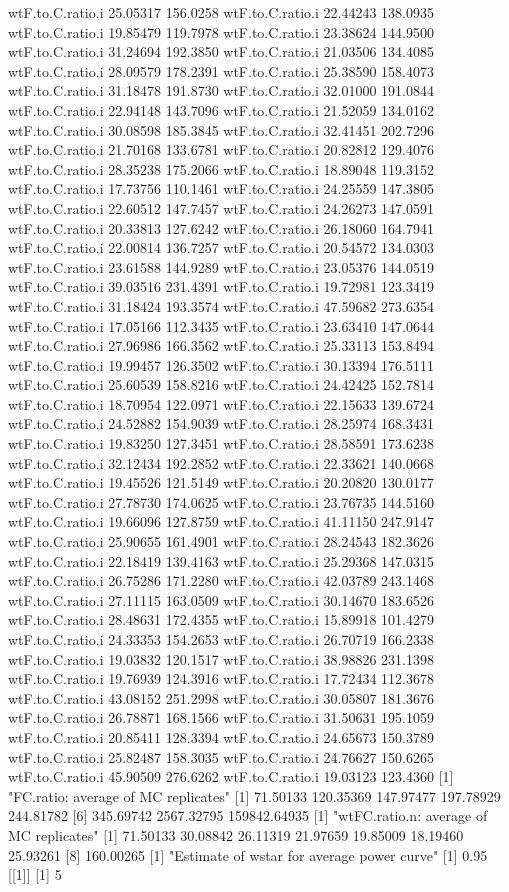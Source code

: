 \documentclass[11pt]{article} %
\begin{document}
\begin{Schunk}
\begin{Soutput}
wtF.to.C.ratio.i 25.05317 156.0258
wtF.to.C.ratio.i 22.44243 138.0935
wtF.to.C.ratio.i 19.85479 119.7978
wtF.to.C.ratio.i 23.38624 144.9500
wtF.to.C.ratio.i 31.24694 192.3850
wtF.to.C.ratio.i 21.03506 134.4085
wtF.to.C.ratio.i 28.09579 178.2391
wtF.to.C.ratio.i 25.38590 158.4073
wtF.to.C.ratio.i 31.18478 191.8730
wtF.to.C.ratio.i 32.01000 191.0844
wtF.to.C.ratio.i 22.94148 143.7096
wtF.to.C.ratio.i 21.52059 134.0162
wtF.to.C.ratio.i 30.08598 185.3845
wtF.to.C.ratio.i 32.41451 202.7296
wtF.to.C.ratio.i 21.70168 133.6781
wtF.to.C.ratio.i 20.82812 129.4076
wtF.to.C.ratio.i 28.35238 175.2066
wtF.to.C.ratio.i 18.89048 119.3152
wtF.to.C.ratio.i 17.73756 110.1461
wtF.to.C.ratio.i 24.25559 147.3805
wtF.to.C.ratio.i 22.60512 147.7457
wtF.to.C.ratio.i 24.26273 147.0591
wtF.to.C.ratio.i 20.33813 127.6242
wtF.to.C.ratio.i 26.18060 164.7941
wtF.to.C.ratio.i 22.00814 136.7257
wtF.to.C.ratio.i 20.54572 134.0303
wtF.to.C.ratio.i 23.61588 144.9289
wtF.to.C.ratio.i 23.05376 144.0519
wtF.to.C.ratio.i 39.03516 231.4391
wtF.to.C.ratio.i 19.72981 123.3419
wtF.to.C.ratio.i 31.18424 193.3574
wtF.to.C.ratio.i 47.59682 273.6354
wtF.to.C.ratio.i 17.05166 112.3435
wtF.to.C.ratio.i 23.63410 147.0644
wtF.to.C.ratio.i 27.96986 166.3562
wtF.to.C.ratio.i 25.33113 153.8494
wtF.to.C.ratio.i 19.99457 126.3502
wtF.to.C.ratio.i 30.13394 176.5111
wtF.to.C.ratio.i 25.60539 158.8216
wtF.to.C.ratio.i 24.42425 152.7814
wtF.to.C.ratio.i 18.70954 122.0971
wtF.to.C.ratio.i 22.15633 139.6724
wtF.to.C.ratio.i 24.52882 154.9039
wtF.to.C.ratio.i 28.25974 168.3431
wtF.to.C.ratio.i 19.83250 127.3451
wtF.to.C.ratio.i 28.58591 173.6238
wtF.to.C.ratio.i 32.12434 192.2852
wtF.to.C.ratio.i 22.33621 140.0668
wtF.to.C.ratio.i 19.45526 121.5149
wtF.to.C.ratio.i 20.20820 130.0177
wtF.to.C.ratio.i 27.78730 174.0625
wtF.to.C.ratio.i 23.76735 144.5160
wtF.to.C.ratio.i 19.66096 127.8759
wtF.to.C.ratio.i 41.11150 247.9147
wtF.to.C.ratio.i 25.90655 161.4901
wtF.to.C.ratio.i 28.24543 182.3626
wtF.to.C.ratio.i 22.18419 139.4163
wtF.to.C.ratio.i 25.29368 147.0315
wtF.to.C.ratio.i 26.75286 171.2280
wtF.to.C.ratio.i 42.03789 243.1468
wtF.to.C.ratio.i 27.11115 163.0509
wtF.to.C.ratio.i 30.14670 183.6526
wtF.to.C.ratio.i 28.48631 172.4355
wtF.to.C.ratio.i 15.89918 101.4279
wtF.to.C.ratio.i 24.33353 154.2653
wtF.to.C.ratio.i 26.70719 166.2338
wtF.to.C.ratio.i 19.03832 120.1517
wtF.to.C.ratio.i 38.98826 231.1398
wtF.to.C.ratio.i 19.76939 124.3916
wtF.to.C.ratio.i 17.72434 112.3678
wtF.to.C.ratio.i 43.08152 251.2998
wtF.to.C.ratio.i 30.05807 181.3676
wtF.to.C.ratio.i 26.78871 168.1566
wtF.to.C.ratio.i 31.50631 195.1059
wtF.to.C.ratio.i 20.85411 128.3394
wtF.to.C.ratio.i 24.65673 150.3789
wtF.to.C.ratio.i 25.82487 158.3035
wtF.to.C.ratio.i 24.76627 150.6265
wtF.to.C.ratio.i 45.90509 276.6262
wtF.to.C.ratio.i 19.03123 123.4360
[1] "FC.ratio: average of MC replicates"
[1]     71.50133    120.35369    147.97477    197.78929    244.81782
[6]    345.69742   2567.32795 159842.64935
[1] "wtFC.ratio.n: average of MC replicates"
[1]  71.50133  30.08842  26.11319  21.97659  19.85009  18.19460  25.93261
[8] 160.00265
[1] "Estimate of wstar for average power curve"
[1] 0.95
[[1]]
[1] 5


\end{Soutput}
\end{Schunk}
\end{document}
